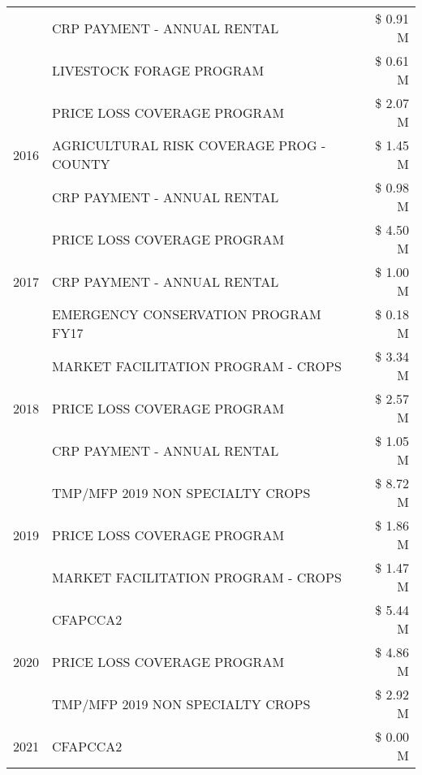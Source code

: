 \begin{tabular}{llr}
 & CRP PAYMENT - ANNUAL RENTAL & \$ 0.91 M \\
 & LIVESTOCK FORAGE PROGRAM & \$ 0.61 M \\
\cline{1-3}
\multirow[t]{3}{*}{2016} & PRICE LOSS COVERAGE PROGRAM & \$ 2.07 M \\
 & AGRICULTURAL RISK COVERAGE PROG - COUNTY & \$ 1.45 M \\
 & CRP PAYMENT - ANNUAL RENTAL & \$ 0.98 M \\
\cline{1-3}
\multirow[t]{3}{*}{2017} & PRICE LOSS COVERAGE PROGRAM & \$ 4.50 M \\
 & CRP PAYMENT - ANNUAL RENTAL & \$ 1.00 M \\
 & EMERGENCY CONSERVATION PROGRAM FY17 & \$ 0.18 M \\
\cline{1-3}
\multirow[t]{3}{*}{2018} & MARKET FACILITATION PROGRAM - CROPS & \$ 3.34 M \\
 & PRICE LOSS COVERAGE PROGRAM & \$ 2.57 M \\
 & CRP PAYMENT - ANNUAL RENTAL & \$ 1.05 M \\
\cline{1-3}
\multirow[t]{3}{*}{2019} & TMP/MFP 2019 NON SPECIALTY CROPS & \$ 8.72 M \\
 & PRICE LOSS COVERAGE PROGRAM & \$ 1.86 M \\
 & MARKET FACILITATION PROGRAM - CROPS & \$ 1.47 M \\
\cline{1-3}
\multirow[t]{3}{*}{2020} & CFAPCCA2 & \$ 5.44 M \\
 & PRICE LOSS COVERAGE PROGRAM & \$ 4.86 M \\
 & TMP/MFP 2019 NON SPECIALTY CROPS & \$ 2.92 M \\
\cline{1-3}
2021 & CFAPCCA2 & \$ 0.00 M \\
\cline{1-3}
\bottomrule
\end{tabular}
